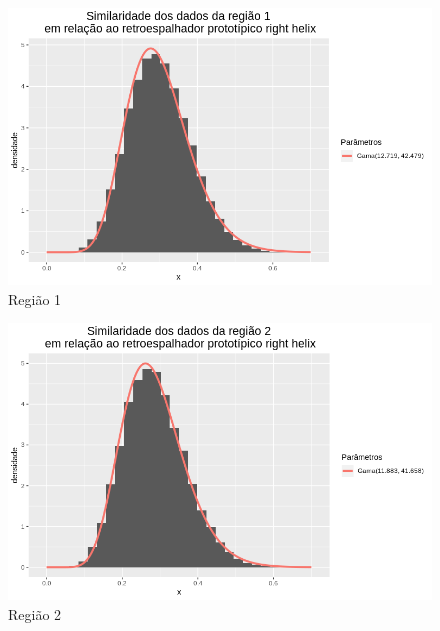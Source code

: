 \documentclass[12pt]{article}
\begin{document}
\begin{figure}[!h]
    \centering
    \includegraphics[width = \linewidth]{../../Images/Report_18_12_20/rh_region1.png}
    \caption{Região 1}
    \label{fig:rh_r1}
\end{figure}

\begin{figure}[!h]
    \centering
    \includegraphics[width = \linewidth]{../../Images/Report_18_12_20/rh_region2.png}
    \caption{Região 2}
    \label{fig:rh_r2}
\end{figure}
\end{document}

